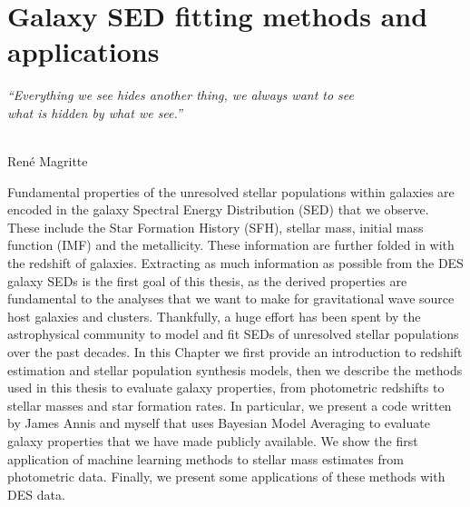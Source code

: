 \chapter{Galaxy SED fitting methods and applications}\label{chp:sed}

\begin{flushright}
  {\em ``Everything we see hides another thing, we always want to see\\ what is hidden by what we see.''}\\

\ \

\normalsize
{Ren\'e Magritte}  
\end{flushright}



Fundamental properties of the unresolved stellar populations within galaxies are encoded in the galaxy Spectral Energy Distribution (SED) that we observe. These include the Star Formation History (SFH), stellar mass, initial mass function (IMF) and the metallicity. These information are further folded in with the redshift of galaxies. Extracting as much information as possible from the DES galaxy SEDs is the first goal of this thesis, as the derived properties are fundamental to the analyses that we want to make for gravitational wave source host galaxies and clusters. Thankfully, a huge effort has been spent by the astrophysical community to model and fit SEDs of unresolved stellar populations over the past decades.
In this Chapter we first provide an introduction to redshift estimation and stellar population synthesis models, then we describe the methods used in this thesis to evaluate galaxy properties, from photometric redshifts to stellar masses and star formation rates. In particular, we present a code written by James Annis and myself that uses Bayesian Model Averaging to evaluate galaxy properties that we have made publicly available. We show the first application of machine learning methods to stellar mass estimates from photometric data. Finally, we present some applications of these methods with DES data.

